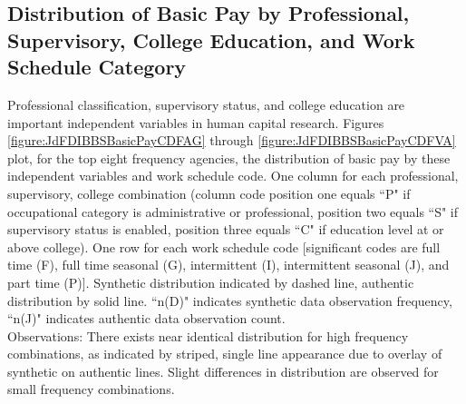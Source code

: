\documentclass[10pt, letterpaper]{article}
\begin{document}
\begin{spacing}{1.0}
\clearpage

\subsection{Distribution of Basic Pay by Professional, Supervisory, College Education, and Work Schedule Category}

Professional classification, supervisory status, and college education are important independent variables in human capital research.  Figures \ref{figure:JdFDIBBSBasicPayCDFAG} through \ref{figure:JdFDIBBSBasicPayCDFVA} plot, for the top eight frequency agencies, the distribution of basic pay by these independent variables and work schedule code.  One column for each professional, supervisory, college combination (column code position one equals ``P" if occupational category is administrative or professional, position two equals ``S" if supervisory status is enabled, position three equals ``C" if education level at or above college).  One row for each work schedule code [significant codes are full time (F), full time seasonal (G), intermittent (I), intermittent seasonal (J), and part time (P)].  Synthetic distribution indicated by dashed line, authentic distribution by solid line.  ``n(D)" indicates synthetic data observation frequency, ``n(J)" indicates authentic data observation count.\\

Observations:  There exists near identical distribution for high frequency combinations, as indicated by striped, single line appearance due to overlay of synthetic on authentic lines.  Slight differences in distribution are observed for small frequency combinations.\\


\end{spacing}
\end{document}
